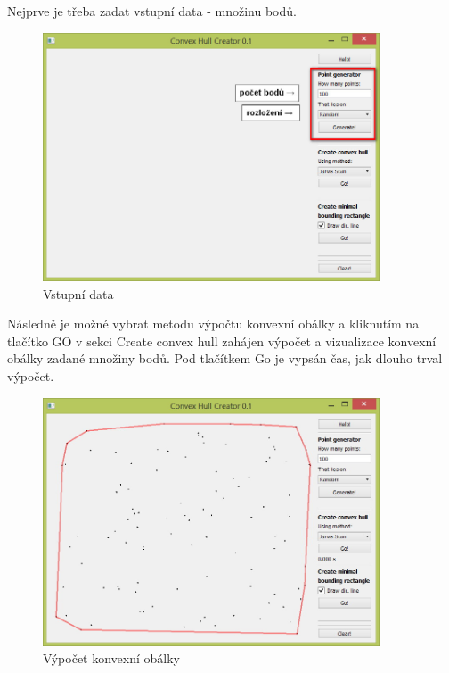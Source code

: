 \documentclass[a4paper, 12pt]{article}
\begin{document}
Nejprve je třeba zadat vstupní data - množinu bodů.\\
\begin{figure}[h!]
	\centering
	\includegraphics[width=10cm]{vstup_nastaveni.jpg}
	\caption{Vstupní data}
\end{figure}

Následně je možné vybrat metodu výpočtu konvexní obálky a kliknutím na tlačítko GO v 
sekci Create convex hull zahájen výpočet a vizualizace konvexní obálky zadané množiny bodů.
Pod tlačítkem Go je vypsán čas, jak dlouho trval výpočet.\\
\begin{figure}[h!]
	\centering
	\includegraphics[width=10cm]{vystup.jpg}
	\caption{Výpočet konvexní obálky}
\end{figure}
\end{document}
